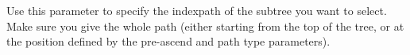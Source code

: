 
Use this parameter to specify the indexpath of the subtree you want to select.
Make sure you give the whole path (either starting from the top of the tree, or at the position defined by the pre-ascend and path type parameters).

